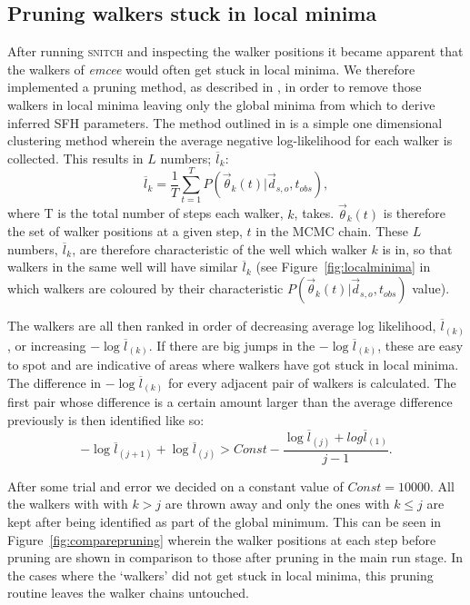 \documentclass[useAMS,usenatbib]{mn2e}
\begin{document}
\subsection{Pruning walkers stuck in local minima}\label{sec:pruning}


After running \textsc{snitch} and inspecting the walker positions it became apparent that the walkers of \emph{emcee} would often get stuck in local minima. We therefore implemented a pruning method, as described in \cite{hou12}, in order to remove those walkers in local minima leaving only the global minima from which to derive inferred SFH parameters. The method outlined in \cite{hou12} is a simple one dimensional clustering method wherein the average negative log-likelihood for each walker is collected. This results in $L$ numbers; $\overline{l}_k$:
\begin{equation}\label{eq:lnumbers}
\overline{l}_k = \frac{1}{T} \sum^{T}_{t=1} P(\vec{\theta}_k(t)|\vec{d}_{s,o}, t_{obs}),
\end{equation}
where T is the total number of steps each walker, $k$, takes. $\vec{\theta}_k(t)$ is therefore the set of walker positions at a given step, $t$ in the MCMC chain. These $L$ numbers, $\overline{l}_k$, are therefore characteristic of the well which walker $k$ is in, so that walkers in the same well will have similar $\overline{l}_k$ (see Figure~\ref{fig:localminima} in which walkers are coloured by their characteristic $P(\vec{\theta}_k(t)|\vec{d}_{s,o}, t_{obs})$ value). 


The walkers are all then ranked in order of decreasing average log likelihood, $\overline{l}_{(k)}$, or increasing $- \log \overline{l}_{(k)}$. If there are big jumps in the $- \log \overline{l}_{(k)}$, these are easy to spot and are indicative of areas where walkers have got stuck in local minima. The difference in $- \log \overline{l}_{(k)}$ for every adjacent pair of walkers is calculated. The first pair whose difference is a certain amount larger than the average difference previously is then identified like so:
\begin{equation}\label{eq:idprunes}
-\log \overline{l}_{(j+1)} + \log \overline{l}_{(j)} > Const − \frac{\log \overline{l}_{(j)} + log \overline{l}_{(1)}}{j - 1}.
\end{equation}



After some trial and error we decided on a constant value of $Const = 10000$. All the walkers with with $k>j$ are thrown away and only the ones with $k \leq j$ are kept after being identified as part of the global minimum. This can be seen in Figure~\ref{fig:comparepruning} wherein the walker positions at each step before pruning are shown in comparison to those after pruning in the main run stage. In the cases where the `walkers' did not get stuck in local minima, this pruning routine leaves the walker chains untouched. 
\end{document}

